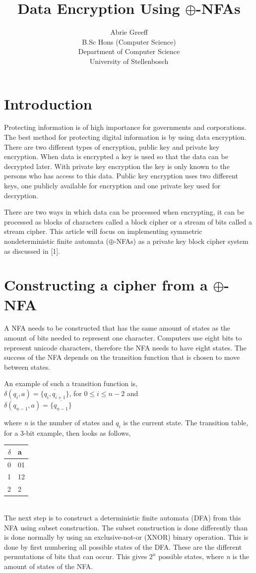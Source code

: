 \documentclass[a4paper,11pt,titlepage]{article}
\author{Abrie Greeff\\B.Sc Hons (Computer Science)\\Department of Computer Science\\University of Stellenbosch}
\title{Data Encryption Using $\oplus$-NFAs}
\begin{document}
\maketitle
\tableofcontents
\section{Introduction}
Protecting information is of high importance for governments and corporations. The best method for protecting digital information is by using data encryption.
There are two different types of encryption, public key and private key encryption. When data is encrypted a key is used so that the data can be decrypted later. With private key encryption the key is only known to the persons who has access to this data. Public key encryption uses two different keys, one publicly available for encryption and one private key used for decryption.

There are two ways in which data can be processed when encrypting, it can be processed as blocks of characters called a block cipher or a stream of bits called a stream cipher.
This article will focus on implementing symmetric nondeterministic finite automata ($\oplus$-NFAs) as a private key block cipher system as discussed in [1].
\section {Constructing a cipher from a $\oplus$-NFA}
A NFA needs to be constructed that has the same amount of states as the amount of bits needed to represent one character. Computers use eight bits to represent unicode characters, therefore the NFA needs to have eight states. The success of the NFA depends on the transition function that is chosen to move between states.

An example of such a transition function is,\\
$\delta(q_i,a)=\overline{\{q_i,q_{i+1}\}}$, for $0\leq i \leq n-2$ and\\
$\delta(q_{n-1},a)=\overline{\{q_{n-1}\}}$


where \emph{n} is the number of states and \emph{$q_i$} is the current state. The transition table, for a 3-bit example, then looks as follows,

\begin{tabular}{|r|l|}
$\delta$ & a\\
\hline
0 & 01\\
1 & 12\\
2 & 2
\end{tabular}
\newline\\
The next step is to construct a deterministic finite automata (DFA) from this NFA using subset construction. The subset construction is done differently than is done normally by using an exclusive-not-or (XNOR) binary operation. This is done by first numbering all possible states of the DFA. These are the different permutations of bits that can occur. This gives $2^n$ possible states, where \emph{n} is the amount of states of the NFA.
\end{document}

